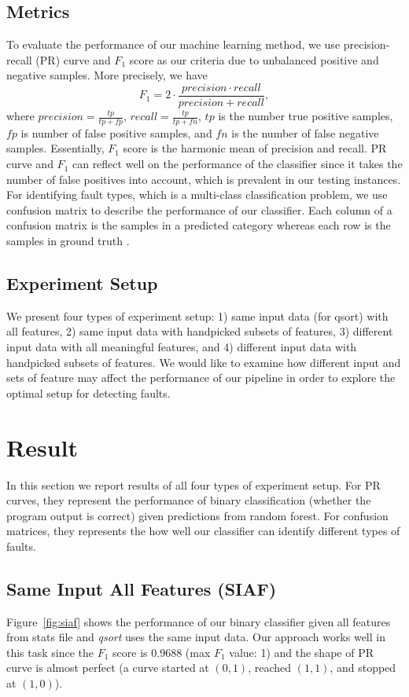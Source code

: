 \subsection{Metrics}
To evaluate the performance of our machine learning method, we use precision-recall (PR) curve and $F_1$ score as our criteria due to unbalanced positive and negative samples. More precisely, we have
\begin{equation}
F_{1} = 2\cdot\frac{precision \cdot recall}{precision + recall},
\end{equation}
where $precision = \frac{tp}{tp+fp}$, $recall = \frac{tp}{tp+fn}$, $tp$ is the number true positive samples, $fp$ is number of false positive samples, and $fn$ is the number of false negative samples. Essentially, $F_1$ score is the harmonic mean of precision and recall. PR curve and $F_1$ can reflect well on the performance of the classifier since it takes the number of false positives into account, which is prevalent in our testing instances. For identifying fault types, which is a multi-class classification problem, we use confusion matrix to describe the performance of our classifier. Each column of a confusion matrix is the samples in a predicted category whereas each row is the samples in ground truth \cite{powers2011evaluation}.

\subsection{Experiment Setup}
We present four types of experiment setup: 1) same input data (for qsort) with all features, 2) same input data with handpicked subsets of features, 3) different input data with all meaningful features, and 4) different input data with handpicked subsets of features. We would like to examine how different input and sets of feature  may affect the performance of our pipeline in order to explore the optimal setup for detecting faults.

\section{Result}
In this section we report results of all four types of experiment setup. For PR curves, they represent the performance of binary classification (whether the program output is correct) given predictions from random forest. For confusion matrices, they represents the how well our classifier can identify different types of faults.

\subsection{Same Input All Features (SIAF)}
Figure~\ref{fig:siaf} shows the performance of our binary classifier given all features from stats file and \emph{qsort} uses the same input data. Our approach works well in this task since the $F_1$ score is 0.9688 (max $F_1$ value: 1) and the shape of PR curve is almost perfect (a curve started at $(0,1)$, reached $(1,1)$, and stopped at $(1,0)$). 

